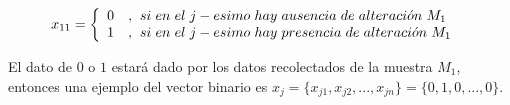 \begin{myexample}
	\begin{eqnarray*}
 x_{11}= \left\{\begin{array}{ll}
0&,\hspace{4px} si\hspace{3px}en\hspace{3px}el\hspace{3px}j-esimo\hspace{3px}hay \hspace{3px}ausencia\hspace{3px}de\hspace{3px}alteraci\acute{o}n\hspace{3px}M_{1}\\
1 &,\hspace{4px} si\hspace{3px}en\hspace{3px}el\hspace{3px}j-esimo\hspace{3px}hay \hspace{3px}presencia\hspace{3px}de\hspace{3px}alteraci\acute{o}n\hspace{3px}M_{1}\\ 
				\end{array} \hspace{6px} \right.
	\end{eqnarray*}
	
El dato de $0$ o $1$ estará dado por los datos recolectados de la muestra $M_{1}$, entonces una ejemplo del vector binario es $x_{j}=\{x_{j1},x_{j2},...,x_{jn}\}=\{0,1,0,...,0\}$.
\end{myexample}


